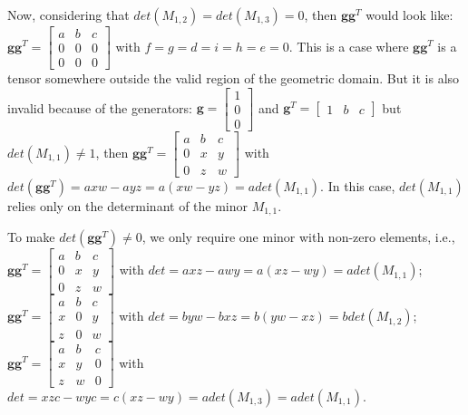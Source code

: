 \begin{otherlanguage}{english}
Now, considering that $det(M_{1,2}) = det(M_{1,3}) = 0$, then $\mathbf{gg}^{T}$ would look like:
$
\mathbf{gg}^{T} =
\begin{bmatrix}
	a & b & c \\
    0 & 0 & 0 \\
    0 & 0 & 0 
\end{bmatrix}
$
with $f=g=d=i=h=e=0$. This is a case where $\mathbf{gg}^{T}$ is a tensor somewhere outside the valid region of the geometric domain. But it is also invalid because of the generators:
$
\mathbf{g} =
\begin{bmatrix}
	1 \\
    0 \\
    0 
\end{bmatrix}
$
and
$
\mathbf{g}^{T} =
\begin{bmatrix}
	1 & b & c 
\end{bmatrix}
$
but $det(M_{1,1}) \neq 1$, then
$
\mathbf{gg}^{T} =
\begin{bmatrix}
	a & b & c \\
    0 & x & y \\
    0 & z & w 
\end{bmatrix}
$
with $det(\mathbf{gg}^{T}) = axw - ayz = a(xw - yz) = a det(M_{1,1})$. In this case, $det(M_{1,1})$ relies only on the determinant of the minor $M_{1,1}$.

To make $det(\mathbf{gg}^{T}) \neq 0$, we only require one minor with non-zero elements, i.e.,
$
\mathbf{gg}^{T} =
\begin{bmatrix}
	a & b & c \\
    0 & x & y \\
    0 & z & w 
\end{bmatrix}
$
with $det = axz - awy = a(xz - wy) = a det(M_{1,1})$;
$
\mathbf{gg}^{T} =
\begin{bmatrix}
	a & b & c \\
    x & 0 & y \\
    z & 0 & w 
\end{bmatrix}
$
with $det = byw - bxz = b(yw - xz) = b det(M_{1,2})$;
$
\mathbf{gg}^{T} =
\begin{bmatrix}
	a & b & c \\
    x & y & 0 \\
    z & w & 0 
\end{bmatrix}
$
with $det = xzc - wyc = c(xz - wy) = a det(M_{1,3}) = a det(M_{1,1})$.


\end{otherlanguage}
